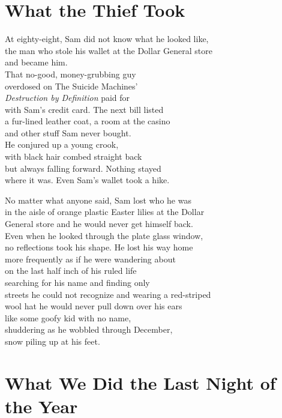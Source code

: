 \documentclass[twoside,10pt]{book}
\begin{document}
\clearpage
\section{What the Thief Took}

At eighty-eight, Sam did not know what he looked like,\\
the man who stole his wallet at the Dollar General store\\
and became him.\\
That no-good, money-grubbing guy\\
overdosed on The Suicide Machines'\\
\emph{Destruction by Definition} paid for\\
with Sam's credit card. The next bill listed\\
a fur-lined leather coat, a room at the casino\\
and other stuff Sam never bought.\\
He conjured up a young crook,\\
with black hair combed straight back\\
but always falling forward. Nothing stayed\\
where it was. Even Sam's wallet took a hike.

No matter what anyone said, Sam lost who he was\\
in the aisle of orange plastic Easter lilies at the Dollar\\
General store and he would never get himself back.\\
Even when he looked through the plate glass window,\\
no reflections took his shape. He lost his way home\\
more frequently as if he were wandering about\\
on the last half inch of his ruled life\\
searching for his name and finding only\\
streets he could not recognize and wearing a red-striped\\
wool hat he would never pull down over his ears\\
like some goofy kid with no name,\\
shuddering as he wobbled through December,\\
snow piling up at his feet.


\clearpage
\section{What We Did the Last Night of the Year}
\end{document}
